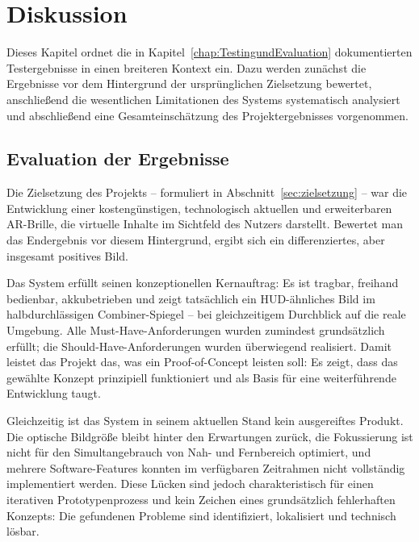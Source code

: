 

\chapter{Diskussion}
\label{chap:Diskussion}

Dieses Kapitel ordnet die in Kapitel~\ref{chap:TestingundEvaluation} dokumentierten
Testergebnisse in einen breiteren Kontext ein.
Dazu werden zunächst die Ergebnisse vor dem Hintergrund der ursprünglichen
Zielsetzung bewertet, anschließend die wesentlichen Limitationen des Systems
systematisch analysiert und abschließend eine Gesamteinschätzung des
Projektergebnisses vorgenommen.

\section{Evaluation der Ergebnisse}
\label{sec:EvaluationDerErgebnisse}

Die Zielsetzung des Projekts -- formuliert in Abschnitt~\ref{sec:zielsetzung} --
war die Entwicklung einer kostengünstigen, technologisch aktuellen und erweiterbaren
AR-Brille, die virtuelle Inhalte im Sichtfeld des Nutzers darstellt.
Bewertet man das Endergebnis vor diesem Hintergrund, ergibt sich ein
differenziertes, aber insgesamt positives Bild.

Das System erfüllt seinen konzeptionellen Kernauftrag:
Es ist tragbar, freihand bedienbar, akkubetrieben und zeigt tatsächlich ein
HUD-ähnliches Bild im halbdurchlässigen Combiner-Spiegel -- bei gleichzeitigem
Durchblick auf die reale Umgebung.
Alle Must-Have-Anforderungen wurden zumindest grundsätzlich erfüllt;
die Should-Have-Anforderungen wurden überwiegend realisiert.
Damit leistet das Projekt das, was ein Proof-of-Concept leisten soll:
Es zeigt, dass das gewählte Konzept prinzipiell funktioniert und als Basis
für eine weiterführende Entwicklung taugt.

Gleichzeitig ist das System in seinem aktuellen Stand kein ausgereiftes Produkt.
Die optische Bildgröße bleibt hinter den Erwartungen zurück,
die Fokussierung ist nicht für den Simultangebrauch von Nah- und Fernbereich
optimiert, und mehrere Software-Features konnten im verfügbaren Zeitrahmen
nicht vollständig implementiert werden.
Diese Lücken sind jedoch charakteristisch für einen iterativen Prototypenprozess
und kein Zeichen eines grundsätzlich fehlerhaften Konzepts:
Die gefundenen Probleme sind identifiziert, lokalisiert und technisch lösbar.

